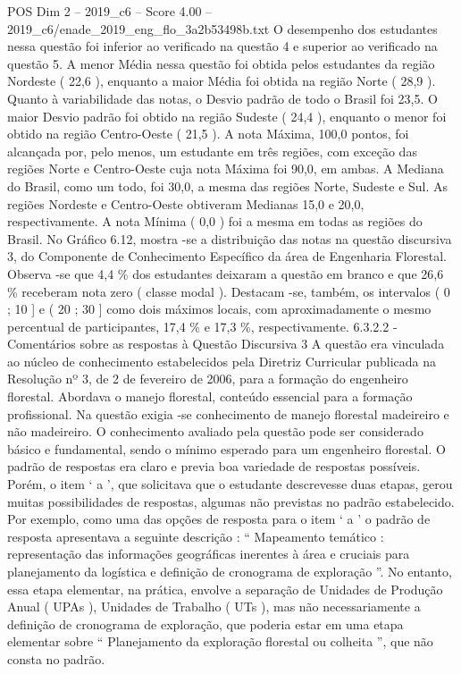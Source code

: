 \begin{textsample}{POS Dim 2 – 2019\_c6 – Score 4.00 – 2019\_c6/enade\_2019\_eng\_flo\_3a2b53498b.txt}
O desempenho dos estudantes nessa questão foi inferior ao verificado na questão 4 e superior ao verificado na questão 5.
A menor Média nessa questão foi obtida pelos estudantes da região Nordeste ( 22,6 ), enquanto a maior Média foi obtida na região Norte ( 28,9 ).
Quanto à variabilidade das notas, o Desvio padrão de todo o Brasil foi 23,5.
O maior Desvio padrão foi obtido na região Sudeste ( 24,4 ), enquanto o menor foi obtido na região Centro-Oeste ( 21,5 ).
A nota Máxima, 100,0 pontos, foi alcançada por, pelo menos, um estudante em três regiões, com exceção das regiões Norte e Centro-Oeste cuja nota Máxima foi 90,0, em ambas.
A Mediana do Brasil, como um todo, foi 30,0, a mesma das regiões Norte, Sudeste e Sul.
As regiões Nordeste e Centro-Oeste obtiveram Medianas 15,0 e 20,0, respectivamente.
A nota Mínima ( 0,0 ) foi a mesma em todas as regiões do Brasil.
No Gráfico 6.12, mostra -se a distribuição das notas na questão discursiva 3, do Componente de Conhecimento Específico da área de Engenharia Florestal.
Observa -se que 4,4 \% dos estudantes deixaram a questão em branco e que 26,6 \% receberam nota zero ( classe modal ).
Destacam -se, também, os intervalos ( 0 ; 10 ] e ( 20 ; 30 ] como dois máximos locais, com aproximadamente o mesmo percentual de participantes, 17,4 \% e 17,3 \%, respectivamente. 6.3.2.2 - Comentários sobre as respostas à Questão Discursiva 3 A questão era vinculada ao núcleo de conhecimento estabelecidos pela Diretriz Curricular publicada na Resolução nº 3, de 2 de fevereiro de 2006, para a formação do engenheiro florestal.
Abordava o manejo florestal, conteúdo essencial para a formação profissional.
Na questão exigia -se conhecimento de manejo florestal madeireiro e não madeireiro.
O conhecimento avaliado pela questão pode ser considerado básico e fundamental, sendo o mínimo esperado para um engenheiro florestal.
O padrão de respostas era claro e previa boa variedade de respostas possíveis.
Porém, o item ‘ a ’, que solicitava que o estudante descrevesse duas etapas, gerou muitas possibilidades de respostas, algumas não previstas no padrão estabelecido.
Por exemplo, como uma das opções de resposta para o item ‘ a ’ o padrão de resposta apresentava a seguinte descrição : “ Mapeamento temático : representação das informações geográficas inerentes à área e cruciais para planejamento da logística e definição de cronograma de exploração ”.
No entanto, essa etapa elementar, na prática, envolve a separação de Unidades de Produção Anual ( UPAs ), Unidades de Trabalho ( UTs ), mas não necessariamente a definição de cronograma de exploração, que poderia estar em uma etapa elementar sobre “ Planejamento da exploração florestal ou colheita ”, que não consta no padrão.

\end{textsample}
